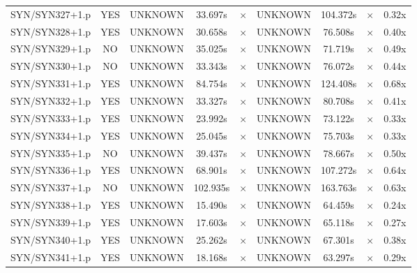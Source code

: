 \documentclass[a4paper,10pt]{article}
\begin{document}
\begin{longtable}{lcccccccc}
SYN/SYN327+1.p & YES & UNKNOWN & 33.697s & \cellcolor{mismatchcolor}$\times$ & UNKNOWN & 104.372s & \cellcolor{mismatchcolor}$\times$ & 0.32x \\
SYN/SYN328+1.p & YES & UNKNOWN & 30.658s & \cellcolor{mismatchcolor}$\times$ & UNKNOWN & 76.508s & \cellcolor{mismatchcolor}$\times$ & 0.40x \\
SYN/SYN329+1.p & NO & UNKNOWN & 35.025s & \cellcolor{mismatchcolor}$\times$ & UNKNOWN & 71.719s & \cellcolor{mismatchcolor}$\times$ & 0.49x \\
SYN/SYN330+1.p & NO & UNKNOWN & 33.343s & \cellcolor{mismatchcolor}$\times$ & UNKNOWN & 76.072s & \cellcolor{mismatchcolor}$\times$ & 0.44x \\
SYN/SYN331+1.p & YES & UNKNOWN & 84.754s & \cellcolor{mismatchcolor}$\times$ & UNKNOWN & 124.408s & \cellcolor{mismatchcolor}$\times$ & 0.68x \\
SYN/SYN332+1.p & YES & UNKNOWN & 33.327s & \cellcolor{mismatchcolor}$\times$ & UNKNOWN & 80.708s & \cellcolor{mismatchcolor}$\times$ & 0.41x \\
SYN/SYN333+1.p & YES & UNKNOWN & 23.992s & \cellcolor{mismatchcolor}$\times$ & UNKNOWN & 73.122s & \cellcolor{mismatchcolor}$\times$ & 0.33x \\
SYN/SYN334+1.p & YES & UNKNOWN & 25.045s & \cellcolor{mismatchcolor}$\times$ & UNKNOWN & 75.703s & \cellcolor{mismatchcolor}$\times$ & 0.33x \\
SYN/SYN335+1.p & NO & UNKNOWN & 39.437s & \cellcolor{mismatchcolor}$\times$ & UNKNOWN & 78.667s & \cellcolor{mismatchcolor}$\times$ & 0.50x \\
SYN/SYN336+1.p & YES & UNKNOWN & 68.901s & \cellcolor{mismatchcolor}$\times$ & UNKNOWN & 107.272s & \cellcolor{mismatchcolor}$\times$ & 0.64x \\
SYN/SYN337+1.p & NO & UNKNOWN & 102.935s & \cellcolor{mismatchcolor}$\times$ & UNKNOWN & 163.763s & \cellcolor{mismatchcolor}$\times$ & 0.63x \\
SYN/SYN338+1.p & YES & UNKNOWN & 15.490s & \cellcolor{mismatchcolor}$\times$ & UNKNOWN & 64.459s & \cellcolor{mismatchcolor}$\times$ & 0.24x \\
SYN/SYN339+1.p & YES & UNKNOWN & 17.603s & \cellcolor{mismatchcolor}$\times$ & UNKNOWN & 65.118s & \cellcolor{mismatchcolor}$\times$ & 0.27x \\
SYN/SYN340+1.p & YES & UNKNOWN & 25.262s & \cellcolor{mismatchcolor}$\times$ & UNKNOWN & 67.301s & \cellcolor{mismatchcolor}$\times$ & 0.38x \\
SYN/SYN341+1.p & YES & UNKNOWN & 18.168s & \cellcolor{mismatchcolor}$\times$ & UNKNOWN & 63.297s & \cellcolor{mismatchcolor}$\times$ & 0.29x \\

\end{longtable}
\end{document}
